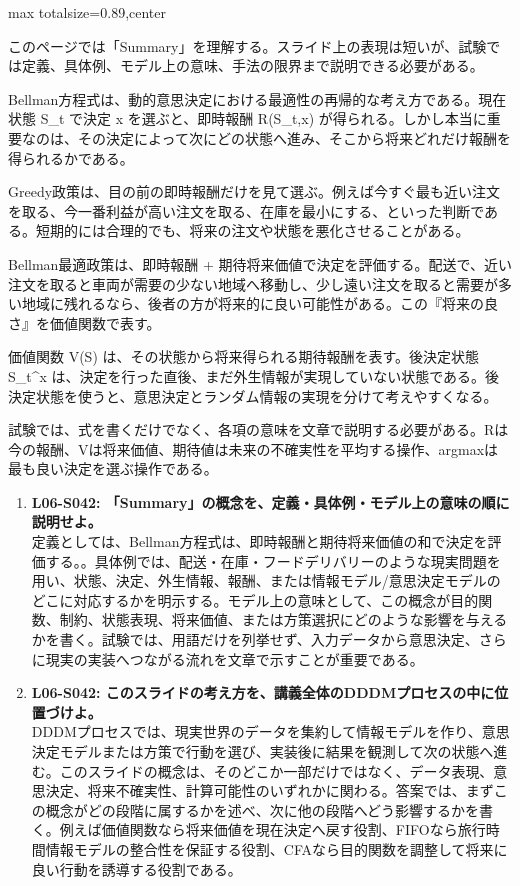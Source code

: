 \begin{minipage}[t]{0.58\textwidth}
\begin{adjustbox}{max totalsize={\textwidth}{0.89\textheight},center}
\begin{minipage}{\textwidth}\scriptsize
{}このページでは「Summary」を理解する。スライド上の表現は短いが、試験では定義、具体例、モデル上の意味、手法の限界まで説明できる必要がある。\par
Bellman方程式は、動的意思決定における最適性の再帰的な考え方である。現在状態 S\_t で決定 x を選ぶと、即時報酬 R(S\_t,x) が得られる。しかし本当に重要なのは、その決定によって次にどの状態へ進み、そこから将来どれだけ報酬を得られるかである。\par
Greedy政策は、目の前の即時報酬だけを見て選ぶ。例えば今すぐ最も近い注文を取る、今一番利益が高い注文を取る、在庫を最小にする、といった判断である。短期的には合理的でも、将来の注文や状態を悪化させることがある。\par
Bellman最適政策は、即時報酬 + 期待将来価値で決定を評価する。配送で、近い注文を取ると車両が需要の少ない地域へ移動し、少し遠い注文を取ると需要が多い地域に残れるなら、後者の方が将来的に良い可能性がある。この『将来の良さ』を価値関数で表す。\par
価値関数 V(S) は、その状態から将来得られる期待報酬を表す。後決定状態 S\_t\textasciicircum{}x は、決定を行った直後、まだ外生情報が実現していない状態である。後決定状態を使うと、意思決定とランダム情報の実現を分けて考えやすくなる。\par
試験では、式を書くだけでなく、各項の意味を文章で説明する必要がある。Rは今の報酬、Vは将来価値、期待値は未来の不確実性を平均する操作、argmaxは最も良い決定を選ぶ操作である。\par{}\begin{enumerate}\item \textbf{L06-S042: 「Summary」の概念を、定義・具体例・モデル上の意味の順に説明せよ。}\\定義としては、Bellman方程式は、即時報酬と期待将来価値の和で決定を評価する。。具体例では、配送・在庫・フードデリバリーのような現実問題を用い、状態、決定、外生情報、報酬、または情報モデル/意思決定モデルのどこに対応するかを明示する。モデル上の意味として、この概念が目的関数、制約、状態表現、将来価値、または方策選択にどのような影響を与えるかを書く。試験では、用語だけを列挙せず、入力データから意思決定、さらに現実の実装へつながる流れを文章で示すことが重要である。\item \textbf{L06-S042: このスライドの考え方を、講義全体のDDDMプロセスの中に位置づけよ。}\\DDDMプロセスでは、現実世界のデータを集約して情報モデルを作り、意思決定モデルまたは方策で行動を選び、実装後に結果を観測して次の状態へ進む。このスライドの概念は、そのどこか一部だけではなく、データ表現、意思決定、将来不確実性、計算可能性のいずれかに関わる。答案では、まずこの概念がどの段階に属するかを述べ、次に他の段階へどう影響するかを書く。例えば価値関数なら将来価値を現在決定へ戻す役割、FIFOなら旅行時間情報モデルの整合性を保証する役割、CFAなら目的関数を調整して将来に良い行動を誘導する役割である。\end{enumerate}

\end{minipage}
\end{adjustbox}
\end{minipage}
